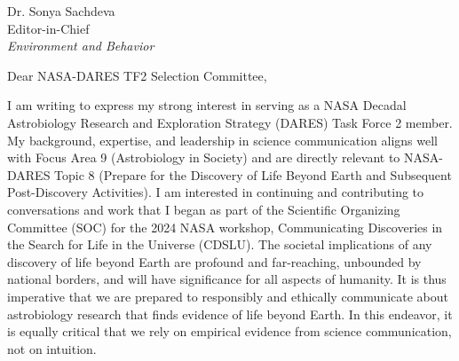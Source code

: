 \documentclass[12pt]{GUETletter}
\date{\vspace{10mm} \today}
\makeatletter
\def\Where{\hspace{-1.2mm}\textbf{\color{black}
Department of Communication \mbox{University of Utah}
}}
\def\Address{255 South Central Campus Drive\\
Languages and Communication Building}
\def\CityZip{Salt Lake City, Utah 84112}
\def\Email{\textbf{\color{black}E-mail}: \href{mailto:sara.yeo@utah.edu}{sara.yeo@utah.edu}}
\def\newaddress{
\Where\\ 
\Address\\ 
\CityZip\\ 
\TEL\\ 
\FAX\\
\Email\\ 
\URL 
}
\makeatother
\begin{document}
% 

\begin{letter}{
               Dr. Sonya Sachdeva\\ 
               Editor-in-Chief\\
               \textit{Environment and Behavior}
               }


\opening{Dear NASA-DARES TF2 Selection Committee,}

I am writing to express my strong interest in serving as a NASA Decadal Astrobiology Research and Exploration Strategy (DARES) Task Force 2 member. My background, expertise, and leadership in science communication aligns well with Focus Area 9 (Astrobiology in Society) and are directly relevant to NASA-DARES Topic 8 (Prepare for the Discovery of Life Beyond Earth and Subsequent Post-Discovery Activities). I am interested in continuing and contributing to conversations and work that I began as part of the Scientific Organizing Committee (SOC) for the 2024 NASA workshop, Communicating Discoveries in the Search for Life in the Universe (CDSLU). The societal implications of any discovery of life beyond Earth are profound and far-reaching, unbounded by national borders, and will have significance for all aspects of humanity. It is thus imperative that we are prepared to responsibly and ethically communicate about astrobiology research that finds evidence of life beyond Earth. In this endeavor, it is equally critical that we rely on empirical evidence from science communication, not on intuition.

\vspace{1em}


\end{letter}
\end{document}
